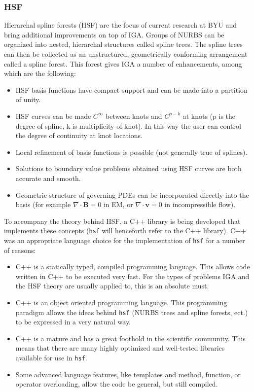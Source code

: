       \subsubsection{HSF} \label{ssub:hsfpy}

        Hierarchal spline forests (HSF) are the focus of current research at BYU and bring additional improvements on top of IGA. Groups of NURBS can be organized into nested, hierarchal structures called spline trees.  The spline trees can then be collected as an unstructured, geometrically conforming arrangement called a spline forest. This forest gives IGA a number of enhancements, among which are the following:

    \begin{itemize}
      \item HSF basis functions have compact support and can be made into a partition of unity.
      \item HSF curves can be made $C^{\infty}$ between knots and $C^{p-k}$ at knots (p is the degree of spline, k is multiplicity of knot). In this way the user can control the degree of continuity at knot locations.
      \item Local refinement of basis functions is possible (not generally true of splines).
      \item Solutions to boundary value problems obtained using HSF curves are both accurate and smooth.
      \item Geometric structure of governing PDEs can be incorporated directly into the basis (for example $\nabla\cdot\mathbf{B} = 0$ in EM, or $\nabla\cdot\mathbf{v} = 0$ in incompressible flow).
    \end{itemize}
    \mainstretch{}

    To accompany the theory behind HSF, a C++ library is being developed that implements these concepts (\texttt{hsf} will henceforth refer to the C++ library). C++ was an appropriate language choice for the implementation of \texttt{hsf} for a number of reasons:

    \begin{itemize}
      \item C++ is a statically typed, compiled programming language. This allows code written in C++ to be executed very fast. For the types of problems IGA and the HSF theory are usually applied to, this is an absolute must.
      \item C++ is an object oriented programming language. This programming paradigm allows the ideas behind \texttt{hsf} (NURBS trees and spline forests, ect.) to be expressed in a very natural way.
      \item C++ is a mature and has a great foothold in the scientific community. This means that there are many highly optimized and well-tested libraries available for use in \texttt{hsf}.
      \item Some advanced language features, like templates and method, function, or operator overloading, allow the code be general, but still compiled.
    \end{itemize}
    \mainstretch{}

